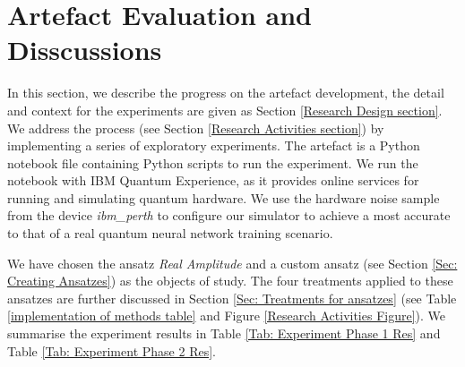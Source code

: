 \section{Artefact Evaluation and Disscussions} \label{Result section}

In this section, we describe the progress on the artefact development, the detail and context for the experiments are given as Section \ref{Research Design section}.
We address the process (see Section \ref{Research Activities section}) by implementing a series of exploratory experiments.
The artefact is a Python notebook file containing Python scripts to run the experiment.
We run the notebook with IBM Quantum Experience, as it provides online services for running and simulating quantum hardware.
We use the hardware noise sample from the device \emph{ibm\_perth} to configure our simulator to achieve a most accurate to that of a real quantum neural network training scenario.

We have chosen the ansatz \emph{Real Amplitude} and a custom ansatz (see Section \ref{Sec: Creating Ansatzes}) as the objects of study.
The four treatments applied to these ansatzes are further discussed in Section \ref{Sec: Treatments for ansatzes} (see Table \ref{implementation of methods table} and Figure \ref{Research Activities Figure}).
We summarise the experiment results in Table \ref{Tab: Experiment Phase 1 Res} and Table \ref{Tab: Experiment Phase 2 Res}.



% 

% 

% 

% 

% 




